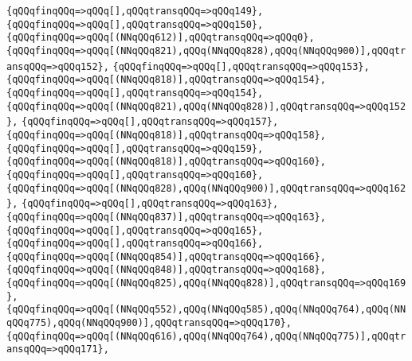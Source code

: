 \verb|{qQQqfinqQQq=>qQQq[],qQQqtransqQQq=>qQQq149},|\newline
\verb|{qQQqfinqQQq=>qQQq[],qQQqtransqQQq=>qQQq150},|\newline
\verb|{qQQqfinqQQq=>qQQq[(NNqQQq612)],qQQqtransqQQq=>qQQq0},|\newline
\verb|{qQQqfinqQQq=>qQQq[(NNqQQq821),qQQq(NNqQQq828),qQQq(NNqQQq900)],qQQqtransqQQq=>qQQq152},|\newline
\verb|{qQQqfinqQQq=>qQQq[],qQQqtransqQQq=>qQQq153},|\newline
\verb|{qQQqfinqQQq=>qQQq[(NNqQQq818)],qQQqtransqQQq=>qQQq154},|\newline
\verb|{qQQqfinqQQq=>qQQq[],qQQqtransqQQq=>qQQq154},|\newline
\verb|{qQQqfinqQQq=>qQQq[(NNqQQq821),qQQq(NNqQQq828)],qQQqtransqQQq=>qQQq152},|\newline
\verb|{qQQqfinqQQq=>qQQq[],qQQqtransqQQq=>qQQq157},|\newline
\verb|{qQQqfinqQQq=>qQQq[(NNqQQq818)],qQQqtransqQQq=>qQQq158},|\newline
\verb|{qQQqfinqQQq=>qQQq[],qQQqtransqQQq=>qQQq159},|\newline
\verb|{qQQqfinqQQq=>qQQq[(NNqQQq818)],qQQqtransqQQq=>qQQq160},|\newline
\verb|{qQQqfinqQQq=>qQQq[],qQQqtransqQQq=>qQQq160},|\newline
\verb|{qQQqfinqQQq=>qQQq[(NNqQQq828),qQQq(NNqQQq900)],qQQqtransqQQq=>qQQq162},|\newline
\verb|{qQQqfinqQQq=>qQQq[],qQQqtransqQQq=>qQQq163},|\newline
\verb|{qQQqfinqQQq=>qQQq[(NNqQQq837)],qQQqtransqQQq=>qQQq163},|\newline
\verb|{qQQqfinqQQq=>qQQq[],qQQqtransqQQq=>qQQq165},|\newline
\verb|{qQQqfinqQQq=>qQQq[],qQQqtransqQQq=>qQQq166},|\newline
\verb|{qQQqfinqQQq=>qQQq[(NNqQQq854)],qQQqtransqQQq=>qQQq166},|\newline
\verb|{qQQqfinqQQq=>qQQq[(NNqQQq848)],qQQqtransqQQq=>qQQq168},|\newline
\verb|{qQQqfinqQQq=>qQQq[(NNqQQq825),qQQq(NNqQQq828)],qQQqtransqQQq=>qQQq169},|\newline
\verb|{qQQqfinqQQq=>qQQq[(NNqQQq552),qQQq(NNqQQq585),qQQq(NNqQQq764),qQQq(NNqQQq775),qQQq(NNqQQq900)],qQQqtransqQQq=>qQQq170},|\newline
\verb|{qQQqfinqQQq=>qQQq[(NNqQQq616),qQQq(NNqQQq764),qQQq(NNqQQq775)],qQQqtransqQQq=>qQQq171},|\newline
